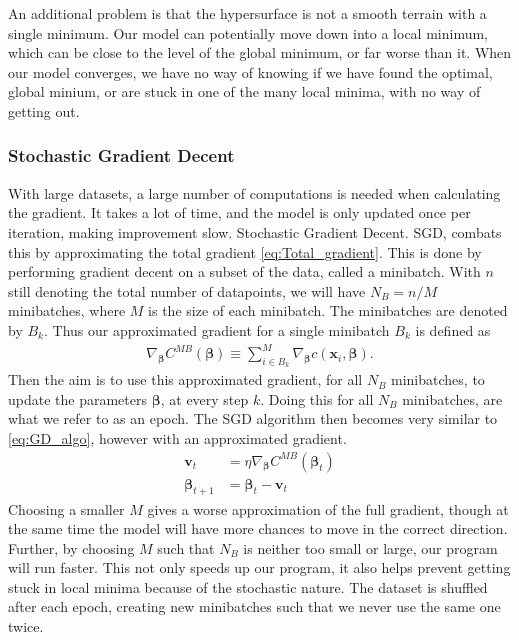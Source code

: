 \documentclass[12pt]{extarticle}
\begin{document}
An additional problem is that the  hypersurface is not a smooth terrain with a single minimum. Our model can potentially move down into a local minimum, which can be close to the level of the global minimum, or far worse than it. When our model converges, we have no way of knowing if we have found the optimal, global minium, or are stuck in one of the many local minima, with no way of getting out.


\subsubsection{Stochastic Gradient Decent}\label{sec:SGD}
With large datasets, a large number of computations is needed when calculating the gradient. It takes a lot of time, and the model is only updated once per iteration, making improvement slow. Stochastic Gradient Decent. SGD, combats this by approximating the total gradient \eqref{eq:Total_gradient}. This is done by performing  gradient decent on a subset of the data, called a minibatch. With $n$ still denoting the total number of datapoints, we will have $N_B=n/M$ minibatches, where $M$ is the size of each minibatch. The minibatches are denoted by $B_k$. Thus our approximated gradient for a single minibatch $B_k$ is defined as
\begin{align}
	\nabla_{\boldsymbol{\beta}} C^{MB}(\boldsymbol{\beta}) \equiv \sum_{i \in B_k}^M \nabla_{\boldsymbol{\beta}} c(\mathbf{x}_i, \boldsymbol{\beta}).
\end{align}
Then the aim is to use this approximated gradient, for all $N_B$ minibatches, to update the parameters $\boldsymbol{\beta}$, at every step $k$. Doing this for all $N_B$ minibatches, are what we refer to as an epoch. The SGD algorithm then becomes very similar to \eqref{eq:GD_algo}, however with an approximated gradient.
\begin{align}
	\mathbf{v}_t             & = \eta\nabla_{\boldsymbol{\beta}} C^{MB}(\boldsymbol{\beta}_t) \nonumber \\
	\boldsymbol{\beta}_{t+1} & = \boldsymbol{\beta}_t - \mathbf{v}_t
	\label{eq:SGD_algo}
\end{align}
Choosing a smaller $M$ gives a worse approximation of the full gradient, though at the same time the model will have more chances to move in the correct direction. Further, by choosing $M$ such that $N_B$ is neither too small or large, our program will run faster. This not only speeds up our program, it also helps prevent getting stuck in local minima because of the stochastic nature. The dataset is shuffled after each epoch, creating new minibatches such that we never use the same one twice.
\end{document}
